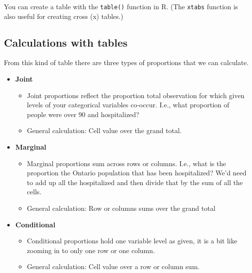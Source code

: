 \documentclass[
  openany]{book}
\newenvironment{Shaded}{\begin{snugshade}}{\end{snugshade}}
\newcommand{\FunctionTok}[1]{\textcolor[rgb]{0.00,0.00,0.00}{#1}}
\newcommand{\NormalTok}[1]{#1}
\newcommand{\OtherTok}[1]{\textcolor[rgb]{0.56,0.35,0.01}{#1}}
\newcommand{\SpecialCharTok}[1]{\textcolor[rgb]{0.00,0.00,0.00}{#1}}
\providecommand{\tightlist}{%
  \setlength{\itemsep}{0pt}\setlength{\parskip}{0pt}}
\begin{document}
You can create a table with the \texttt{table()} function in R. (The \texttt{xtabs}
function is also useful for creating cross (x) tables.)

\begin{Shaded}
\end{Shaded}

\hypertarget{calculations-with-tables}{%
\subsection{Calculations with tables}\label{calculations-with-tables}}

From this kind of table there are three types of proportions that we can
calculate.

\begin{itemize}
\item
  \textbf{Joint}

  \begin{itemize}
  \tightlist
  \item
    Joint proportions reflect the proportion total observation for
    which given levels of your categorical variables co-occur. I.e.,
    what proportion of people were over 90 and hospitalized?
  \item
    General calculation: Cell value over the grand total.
  \end{itemize}
\item
  \textbf{Marginal}

  \begin{itemize}
  \tightlist
  \item
    Marginal proportions sum across rows or columns. I.e., what is
    the proportion the Ontario population that has been
    hospitalized? We'd need to add up all the hospitalized and then
    divide that by the sum of all the cells.
  \item
    General calculation: Row or columns sums over the grand total
  \end{itemize}
\item
  \textbf{Conditional}

  \begin{itemize}
  \tightlist
  \item
    Conditional proportions hold one variable level as given, it is
    a bit like zooming in to only one row or one column.
  \item
    General calculation: Cell value over a row or column sum.
  \end{itemize}
\end{itemize}
\end{document}
